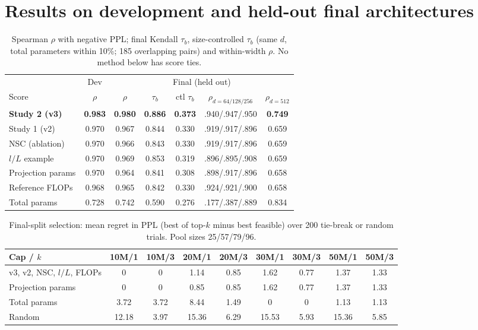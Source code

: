 \documentclass[a4paper,12pt]{article}
\begin{document}
\section{Results on development and held-out final architectures}
\begin{table}[t]
\centering
\caption{Spearman $\rho$ with negative PPL; final Kendall $\tau_b$, size-controlled $\tau_b$ (same $d$, total parameters within 10\%; 185 overlapping pairs) and within-width $\rho$. No method below has score ties.}
\label{tab:rank}
\begin{tabular}{lcccccc}
\toprule
& Dev & \multicolumn{5}{c}{Final (held out)} \\
\cmidrule(lr){2-2}\cmidrule(lr){3-7}
Score & $\rho$ & $\rho$ & $\tau_b$ & ctl $\tau_b$ & $\rho_{d=64/128/256}$ & $\rho_{d=512}$ \\
\midrule
\textbf{Study 2 (v3)} & \textbf{0.983} & \textbf{0.980} & \textbf{0.886} & \textbf{0.373} & .940/.947/.950 & \textbf{0.749} \\
Study 1 (v2) & 0.970 & 0.967 & 0.844 & 0.330 & .919/.917/.896 & 0.659 \\
NSC (ablation) & 0.970 & 0.966 & 0.843 & 0.330 & .919/.917/.896 & 0.659 \\
$l/L$ example & 0.970 & 0.969 & 0.853 & 0.319 & .896/.895/.908 & 0.659 \\
Projection params & 0.970 & 0.964 & 0.841 & 0.308 & .898/.917/.896 & 0.658 \\
Reference FLOPs & 0.968 & 0.965 & 0.842 & 0.330 & .924/.921/.900 & 0.658 \\
Total params & 0.728 & 0.742 & 0.590 & 0.276 & .177/.387/.889 & 0.834 \\
\bottomrule
\end{tabular}
\end{table}

\begin{table}[t]
\centering
\caption{Final-split selection: mean regret in PPL (best of top-$k$ minus best feasible) over 200 tie-break or random trials. Pool sizes 25/57/79/96.}
\label{tab:sel}
\begin{tabular}{lcccccccc}
\toprule
Cap / $k$ & 10M/1 & 10M/3 & 20M/1 & 20M/3 & 30M/1 & 30M/3 & 50M/1 & 50M/3 \\
\midrule
v3, v2, NSC, $l/L$, FLOPs & 0 & 0 & 1.14 & 0.85 & 1.62 & 0.77 & 1.37 & 1.33 \\
Projection params & 0 & 0 & 0.85 & 0.85 & 1.62 & 0.77 & 1.37 & 1.33 \\
Total params & 3.72 & 3.72 & 8.44 & 1.49 & 0 & 0 & 1.13 & 1.13 \\
Random & 12.18 & 3.97 & 15.36 & 6.29 & 15.53 & 5.93 & 15.36 & 5.85 \\
\bottomrule
\end{tabular}
\end{table}
\end{document}
